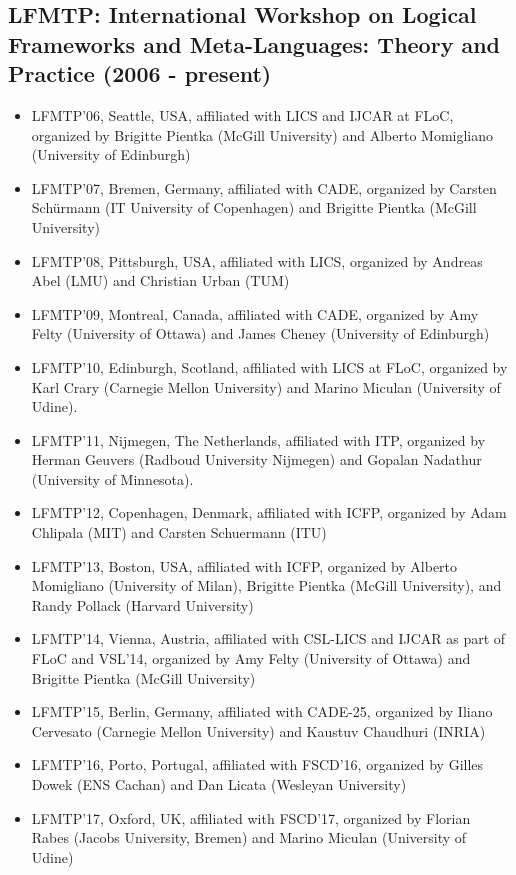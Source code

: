\documentclass{article}
\begin{document}
\subsection{LFMTP: International Workshop on Logical Frameworks and Meta-Languages: Theory and Practice (2006 - present)}

\begin{itemize}
\item LFMTP'06, Seattle, USA, affiliated with LICS and IJCAR at FLoC,
     organized by Brigitte Pientka (McGill University) and Alberto
     Momigliano (University of Edinburgh)

\item LFMTP'07, Bremen, Germany, affiliated with CADE, organized by
     Carsten Sch\"{u}rmann (IT University of Copenhagen) and Brigitte
     Pientka (McGill University)

\item LFMTP'08, Pittsburgh, USA, affiliated with LICS, organized by
     Andreas Abel (LMU) and Christian Urban (TUM)

\item LFMTP'09, Montreal, Canada, affiliated with CADE, organized by
     Amy Felty (University of Ottawa) and James Cheney (University of
     Edinburgh)

\item LFMTP'10, Edinburgh, Scotland, affiliated with LICS at FLoC,
     organized by Karl Crary (Carnegie Mellon University) and Marino
     Miculan (University of Udine).

\item LFMTP'11, Nijmegen, The Netherlands, affiliated with ITP,
     organized by Herman Geuvers (Radboud University Nijmegen) and
     Gopalan Nadathur (University of Minnesota).

\item LFMTP'12, Copenhagen, Denmark, affiliated with ICFP, organized
     by Adam Chlipala (MIT) and Carsten Schuermann (ITU)

\item LFMTP'13, Boston, USA, affiliated with ICFP, organized by Alberto
     Momigliano (University of Milan), Brigitte Pientka (McGill
     University), and Randy Pollack (Harvard University)

\item LFMTP'14, Vienna, Austria, affiliated with CSL-LICS and IJCAR as
     part of FLoC and VSL'14, organized by Amy Felty (University of
     Ottawa) and Brigitte Pientka (McGill University)

\item LFMTP'15, Berlin, Germany, affiliated with CADE-25, organized by
     Iliano Cervesato (Carnegie Mellon University) and Kaustuv
     Chaudhuri (INRIA)

\item LFMTP'16, Porto, Portugal, affiliated with FSCD'16, organized by
     Gilles Dowek (ENS Cachan) and Dan Licata (Wesleyan University)

\item LFMTP'17, Oxford, UK, affiliated with FSCD'17, organized by
     Florian Rabes (Jacobs University, Bremen) and Marino Miculan
     (University of Udine)
\end{itemize}
\end{document}
